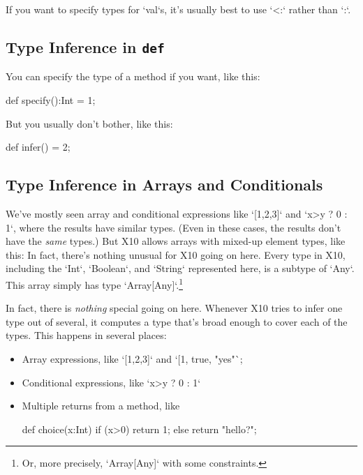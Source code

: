 If you want to specify types for \xcd`val`s, it's usually best to use \xcd`<:`
rather than \xcd`:`.

\subsection{Type Inference in {\tt def}}

You can specify the type of a method if you want, like this: 
\begin{xtennum}[]
def specify():Int = 1;
\end{xtennum}
But you usually don't bother, like this:
\begin{xtennum}[]
def infer() = 2; 
\end{xtennum}


\subsection{Type Inference in Arrays and Conditionals}

We've mostly seen array and conditional expressions like \xcd`[1,2,3]`
and \xcd`x>y ? 0 : 1`, where the results have similar types.  (Even in these
cases, the results don't have the {\em same} types.)  But X10 allows 
arrays with mixed-up element types, like this: 
In fact, there's nothing unusual for X10 going on here.  Every type in X10,
including the  \xcd`Int`, \xcd`Boolean`, and \xcd`String` represented here, is
a subtype of \xcd`Any`.  This array simply has type
\xcd`Array[Any]`.\footnote{Or, more precisely, \xcd`Array[Any]` with some
constraints.}  

In fact, there is {\em nothing} special going on here.  Whenever X10 tries to
infer one type out of several, it computes a type that's broad enough to cover
each of the types.  This happens in several places: 
\begin{itemize}
\item Array expressions, like \xcd`[1,2,3]` and \xcd`[1, true, "yes"`;
\item Conditional expressions, like \xcd`x>y ? 0 : 1`
\item Multiple returns from a method, like 
\begin{xten}
def choice(x:Int) { 
  if (x>0) return 1; else return "hello?"; 
}
\end{xten}
\end{itemize}

